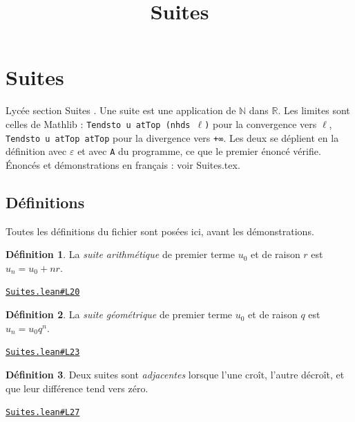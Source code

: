 \documentclass[11pt,a4paper]{article}
\title{Suites}
\date{}
\theoremstyle{definition}
\newtheorem{definition}{Définition}
\theoremstyle{plain}
\newcommand{\source}[2]{\par\smallskip\noindent\hfill{\footnotesize\href{#1}{\texttt{#2}}}\par\smallskip}
\begin{document}
\maketitle
\sloppy

\section{Suites}

\noindent
Lycée \textemdash{} section \og{} Suites \fg{}.
Une suite est une application de \(\mathbb{N}\) dans \(\mathbb{R}\). Les limites sont celles de Mathlib :
\texttt{Tendsto u atTop (nhds \(\ell\))} pour la convergence vers \texttt{\(\ell\)}, \texttt{Tendsto u atTop atTop} pour la
divergence vers \texttt{+∞}. Les deux se déplient en la définition avec \texttt{\(\varepsilon\)} et avec \texttt{A} du
programme, ce que le premier énoncé vérifie.
Énoncés et démonstrations en français : voir Suites.tex.

\subsection{Définitions}

\noindent
Toutes les définitions du fichier sont posées ici, avant les démonstrations.

\begin{definition}
La \emph{suite arithmétique} de premier terme $u_0$ et de raison $r$ est
$u_n = u_0 + nr$.
\end{definition}
\source{https://github.com/Commutator-IO/learn-lean/blob/main/cours/02-lycee/03-suites/Suites.lean\#L20}{Suites.lean\#L20}

\begin{definition}
La \emph{suite géométrique} de premier terme $u_0$ et de raison $q$ est
$u_n = u_0 q^n$.
\end{definition}
\source{https://github.com/Commutator-IO/learn-lean/blob/main/cours/02-lycee/03-suites/Suites.lean\#L23}{Suites.lean\#L23}

\begin{definition}
Deux suites sont \emph{adjacentes} lorsque l'une croît, l'autre décroît, et que leur
différence tend vers zéro.
\end{definition}
\source{https://github.com/Commutator-IO/learn-lean/blob/main/cours/02-lycee/03-suites/Suites.lean\#L27}{Suites.lean\#L27}
\end{document}
